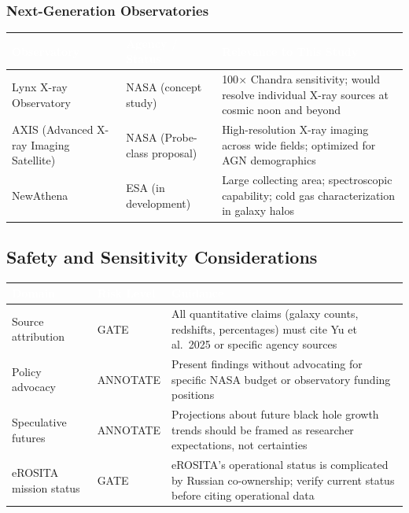 \documentclass[11pt,letterpaper]{article}
\newcommand{\tableheader}[1]{\textbf{\sffamily\textcolor{white}{#1}}}
\begin{document}
\subsubsection{Next-Generation Observatories}

\begin{center}
\begin{tabularx}{\textwidth}{L{3cm}L{3cm}X}
\toprule
{}
\tableheader{Observatory} & \tableheader{Agency / Status} & \tableheader{Relevance to This Study} \\
\midrule
Lynx X-ray Observatory & NASA (concept study) & 100$\times$ Chandra sensitivity; would resolve individual X-ray sources at cosmic noon and beyond \\
AXIS (Advanced X-ray Imaging Satellite) & NASA (Probe-class proposal) & High-resolution X-ray imaging across wide fields; optimized for AGN demographics \\
NewAthena & ESA (in development) & Large collecting area; spectroscopic capability; cold gas characterization in galaxy halos \\
\bottomrule
\end{tabularx}
\end{center}

\subsection{Safety and Sensitivity Considerations}

\begin{center}
\begin{tabularx}{\textwidth}{L{3.5cm}C{2cm}X}
\toprule
{}
\tableheader{Domain} & \tableheader{Risk Level} & \tableheader{Guidance} \\
\midrule
Source attribution & GATE & All quantitative claims (galaxy counts, redshifts, percentages) must cite Yu et al.\ 2025 or specific agency sources \\
Policy advocacy & ANNOTATE & Present findings without advocating for specific NASA budget or observatory funding positions \\
Speculative futures & ANNOTATE & Projections about future black hole growth trends should be framed as researcher expectations, not certainties \\
eROSITA mission status & GATE & eROSITA's operational status is complicated by Russian co-ownership; verify current status before citing operational data \\
\bottomrule
\end{tabularx}
\end{center}
\end{document}
